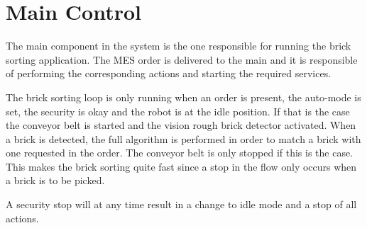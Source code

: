 \section{Main Control}
\label{sec:rc_main}
The main component in the system is the one responsible for running the brick sorting application. The MES order is delivered to the main and it is responsible of performing the corresponding actions and starting the required services.

The brick sorting loop is only running when an order is present, the auto-mode is set, the security is okay and the robot is at the idle position. If that is the case the conveyor belt is started and the vision rough brick detector activated. When a brick is detected, the full algorithm is performed in order to match a brick with one requested in the order. The conveyor belt is only stopped if this is the case. This makes the brick sorting quite fast since a stop in the flow only occurs when a brick is to be picked. 

A security stop will at any time result in a change to idle mode and a stop of all actions. 